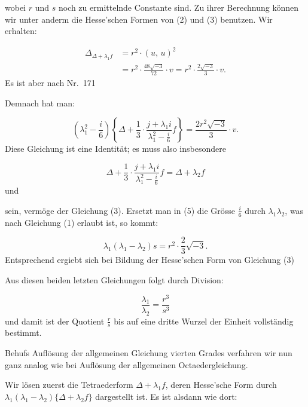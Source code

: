 

wobei $r$ und $s$ noch zu ermittelnde Constante sind. Zu ihrer Berechnung können wir unter anderm die Hesse'schen Formen von (2) und (3) benutzen. Wir erhalten:

\[
\begin{aligned}
\Delta_{\Delta+\lambda_1 f} &= r^2\cdot(u,\,u)^2\\
&= r^2\cdot\frac{48\sqrt{-3}}{72}\cdot v = r^2\cdot\frac{2\sqrt{-3}}{3}\cdot v.
\end{aligned}
\]
Es ist aber nach Nr.\ 171


Demnach hat man:

\[
\left(\lambda_1^2-\frac{i}{6}\right)\left\{\Delta+\frac{1}{3}\cdot\frac{j+\lambda_1 i}{\lambda_1^2-\frac{i}{6}}f\right\} = \frac{2r^2\sqrt{-3}}{3}\cdot v.
\]
Diese Gleichung ist eine Identität; es muss also insbesondere

\[
\Delta+\frac{1}{3}\cdot\frac{j+\lambda_1 i}{\lambda_1^2-\frac{i}{6}}f = \Delta+\lambda_2 f
\]
und


sein, vermöge der Gleichung (3). Ersetzt man in (5) die Grösse $\frac{i}{6}$ durch $\lambda_1\lambda_2$, was nach Gleichung (1) erlaubt ist, so kommt:

\[
\lambda_1(\lambda_1-\lambda_2)s = r^2\cdot\frac{2}{3}\sqrt{-3}.
\]
Entsprechend ergiebt sich bei Bildung der Hesse'schen Form von Gleichung (3)




Aus diesen beiden letzten Gleichungen folgt durch Division:

\[
\frac{\lambda_1}{\lambda_2} = \frac{r^3}{s^3}
\]
und damit ist der Quotient $\frac{r}{s}$ bis auf eine dritte Wurzel der Einheit vollständig bestimmt.

Behufs Auflösung der allgemeinen Gleichung vierten Grades verfahren wir nun ganz analog wie bei Auflösung der allgemeinen Octaedergleichung.

Wir lösen zuerst die Tetraederform $\Delta+\lambda_1 f$, deren Hesse'sche Form durch $\lambda_1(\lambda_1-\lambda_2)\{\Delta+\lambda_2 f\}$ dargestellt ist. Es ist alsdann wie dort:

